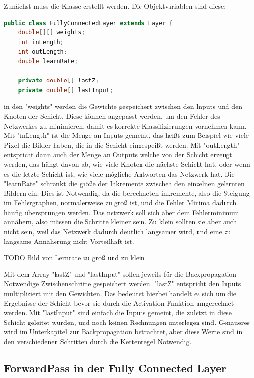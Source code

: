 \documentclass[12pt]{article}
\begin{document}
Zunächst muss die Klasse erstellt werden. Die Objektvariablen sind diese:
    
\begin{lstlisting}[language=Java]
public class FullyConnectedLayer extends Layer {
    double[][] weights;
    int inLength;
    int outLength;
    double learnRate;

    private double[] lastZ;
    private double[] lastInput;
\end{lstlisting} 
in den "weights" werden die Gewichte gespeichert zwischen den Inputs und den Knoten der Schicht. Diese können angepasst werden, um den Fehler des Netzwerkes zu minimieren, damit es korrekte Klassifizierungen vornehmen kann.
Mit "inLength" ist die Menge an Inputs gemeint, das heißt zum Beispiel wie viele Pixel die Bilder haben, die in die Schicht eingespeißt werden.
Mit "outLength" entspricht dann auch der Menge an Outputs welche von der Schicht erzeugt werden, das hängt davon ab, wie viele Knoten die nächste Schicht hat, oder wenn es die letzte Schicht ist, wie viele mögliche Antworten das Netzwerk hat.
Die "learnRate" schränkt die größe der Inkremente zwischen den einzelnen gelernten Bildern ein. Dies ist Notwendig, da die berechneten inkremente, also die Steigung im Fehlergraphen, normalerweise zu groß ist, und die Fehler Minima dadurch häufig übersprungen werden. Das netzwerk soll sich aber dem Fehlerminimum annähern, also müssen die Schritte kleiner sein. Zu klein sollten sie aber auch nicht sein, weil das Netzwerk dadurch deutlich langsamer wird, und eine zu langsame Annäherung nicht Vorteilhaft ist.

TODO Bild von Lernrate zu groß und zu klein

Mit dem Array "lastZ" und "lastInput" sollen jeweils für die Backpropagation Notwendige Zwischenschritte gespeichert werden. "lastZ" entspricht den Inputs multipliziert mit den Gewichten. Das bedeutet hierbei handelt es sich um die Ergebnisse der Schicht bevor sie durch die Activation Funktion umgerechnet werden. Mit "lastInput" sind einfach die Inputs gemeint, die zuletzt in diese Schicht geleitet wurden, und noch keinen Rechnungen unterlegen sind. Genaueres wird im Unterkapitel zur Backpropagation betrachtet, aber diese Werte sind in den verschiedenen Schritten durch die Kettenregel Notwendig.


\subsection{ForwardPass in der Fully Connected Layer}
\end{document}
